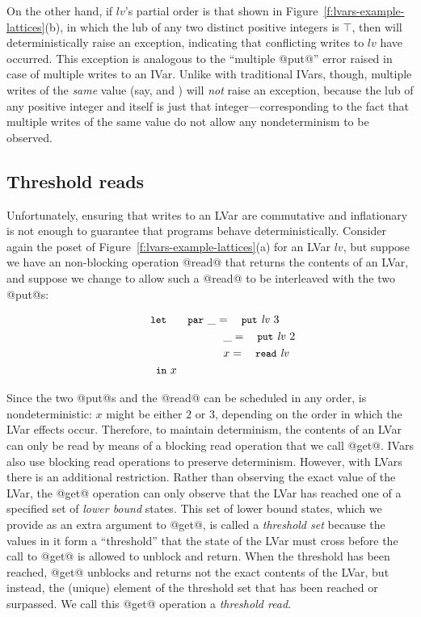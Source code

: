 On the other hand, if $\mathit{lv}$'s partial order is that shown in
Figure~\ref{f:lvars-example-lattices}(b), in which the lub of any two
distinct positive integers is $\top$, then 
will deterministically raise an exception, indicating that conflicting
writes to $\mathit{lv}$ have occurred.  This exception is analogous to
the ``multiple @put@'' error raised in case of multiple writes to an
IVar.  Unlike with traditional IVars, though, multiple writes of the
\emph{same} value (say,  and
) will \emph{not} raise an exception, because
the lub of any positive integer and itself is just that
integer---corresponding to the fact that multiple writes of the same
value do not allow any nondeterminism to be observed.

\subsection{Threshold reads}

Unfortunately, ensuring that writes to an LVar are commutative and
inflationary is not enough to guarantee that programs behave
deterministically.  Consider again the poset of
Figure~\ref{f:lvars-example-lattices}(a) for an LVar $\mathit{lv}$,
but suppose we have an non-blocking operation @read@ that returns the
contents of an LVar, and suppose we change  to
allow such a @read@ to be interleaved with the two @put@s:

\vspace{-8mm}
\singlespacing
\begin{equation}
\begin{split}
& \LETPAR ~\_ = \putexp{\mathit{lv}}{3} \\
&  \letparspace ~\_ = \putexp{\mathit{lv}}{2} \\
&  \letparspace ~x = \termfont{read}~\mathit{lv}\\
&  \letspace \IN~x
\end{split}
\label{e:lvar-example-2}
\end{equation}
\doublespacing

Since the two @put@s and the @read@ can be scheduled in any order,
 is nondeterministic: $x$ might be either $2$
or $3$, depending on the order in which the LVar effects occur.
Therefore, to maintain determinism, the contents of an LVar can only
be read by means of a blocking read operation that we call @get@.
IVars also use blocking read operations to preserve determinism.
However, with LVars there is an additional restriction.  Rather than
observing the exact value of the LVar, the @get@ operation can only
observe that the LVar has reached one of a specified set of
\emph{lower bound} states.  This set of lower bound states, which we
provide as an extra argument to @get@, is called a \emph{threshold
  set} because the values in it form a ``threshold'' that the state of
the LVar must cross before the call to @get@ is allowed to unblock and
return.  When the threshold has been reached, @get@ unblocks and
returns not the exact contents of the LVar, but instead, the (unique)
element of the threshold set that has been reached or surpassed.  We
call this @get@ operation a \emph{threshold read}.

